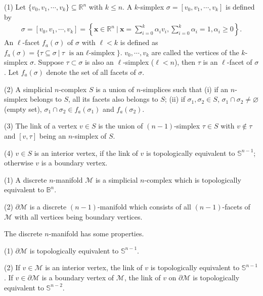 \documentclass{article}
\begin{document}
\begin{definition}
(1) Let $\{v_0,v_1,\cdots,v_k\}\subseteq \mathbb{R}^n$ with $k\leq n$. A $k$-simplex $\sigma = [v_0,v_1,\cdots,v_k]$ is defined by
    \begin{align}
        \sigma = [v_0,v_1,\cdots,v_k]
        = \left\{\mathbf{x}\in \mathbb{R}^n~\Bigg|~ \mathbf{x} = \sum_{i = 0}^k \alpha_iv_i, \sum_{i = 0}^k \alpha_i = 1, \alpha_i \geq 0 \right\}.
    \end{align}
    An $\ell$-facet $f_a(\sigma)$ of $\sigma$ with $\ell<k$ is defined as $f_a(\sigma) = \{\tau \subseteq \sigma~|~ \tau \text{ is an $\ell$-simplex}\}$.
$v_0,\cdots,v_k$ are called the vertices of the $k$-simplex $\sigma$. Suppose $\tau \subset \sigma$ is also an $\ell$-simplex ($\ell<n$), then $\tau$ is an $\ell$-facet of $\sigma$. Let $f_a(\sigma)$ denote the set of all facets of $\sigma$.

(2) A simplicial $n$-complex $S$ is a union of $n$-simplices such that (i) if an $n$-simplex belongs to $S$, all its facets also belongs to $S$; (ii) if $\sigma_1,\sigma_2\in S$, $\sigma_1\cap \sigma_2 \neq \varnothing$ (empty set), $\sigma_1 \cap \sigma_2 \in f_a(\sigma_1)$ and $f_a(\sigma_2)$.

(3) The link of a vertex $v\in S$ is the union of $(n-1)$-simplex $\tau\in S$ with $v\notin \tau$ and $[v,\tau]$ being an $n$-simplex of $S$.

(4) $v\in S$ is an interior vertex, if the link of $v$ is topologically equivalent to $\mathbb{S}^{n-1}$; otherwise $v$ is a boundary vertex.

\end{definition}

\begin{definition} \label{def:manifold_discrete}
    (1) A discrete $n$-manifold $\mathcal{M}$ is a simplicial $n$-complex which is topologically equivalent to $\mathbb{B}^n$.

    (2) $\partial \mathcal{M}$ is a discrete $(n-1)$-manifold which consists of all $(n-1)$-facets of $\mathcal{M}$ with all vertices being boundary vertices.
\end{definition}

The discrete $n$-manifold has some properties.
\begin{property}
    (1) $\partial \mathcal{M}$ is topologically equivalent to $\mathbb{S}^{n-1}$.

    (2) If $v\in \mathcal{M}$  is an interior vertex, the link of $v$ is topologically equivalent to $\mathbb{S}^{n-1}$. If $v\in \partial \mathcal{M}$ is a boundary vertex of $\mathcal{M}$, the link of $v$ on $\partial \mathcal{M}$ is topologically equivalent to $\mathbb{S}^{n-2}$.
\end{property}
\end{document}
